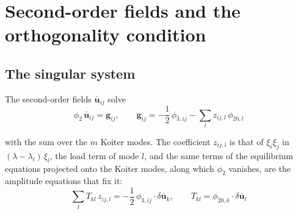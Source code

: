 \documentclass[11pt,a4paper]{article}
\begin{document}
\section{Second-order fields and the orthogonality condition}
\label{sec:secondorder}
\label{sec:ortho}

\subsection{The singular system}

The second-order fields $\boldsymbol{\bar{u}}_{ij}$ solve
\begin{equation}\label{eq:secondorder}
	\phi_2\,\boldsymbol{\bar{u}}_{ij} = \boldsymbol{g}_{ij},
	\qquad
	\boldsymbol{g}_{ij} = -\frac{1}{2}\,\phi_{3,ij}
	  - \sum_{l} z_{ij,l}\,\phi_{20,l}
\end{equation}

\noindent with the sum over the $m$ Koiter modes.  The coefficient $z_{ij,l}$
is that of $\xi_i\xi_j$ in $(\lambda-\lambda_l)\,\xi_l$, the load term of mode
$l$, and the same terms of the equilibrium equations projected onto the Koiter
modes, along which $\phi_2$ vanishes, are the amplitude equations that fix it:
\begin{equation}\label{eq:zij}
	\sum_l T_{kl}\,z_{ij,l}
	= -\frac{1}{2}\,\phi_{3,ij}\cdot\delta\boldsymbol{\bar{u}}_k,
	\qquad
	T_{kl} = \phi_{20,k}\cdot\delta\boldsymbol{\bar{u}}_l
\end{equation}
\end{document}
